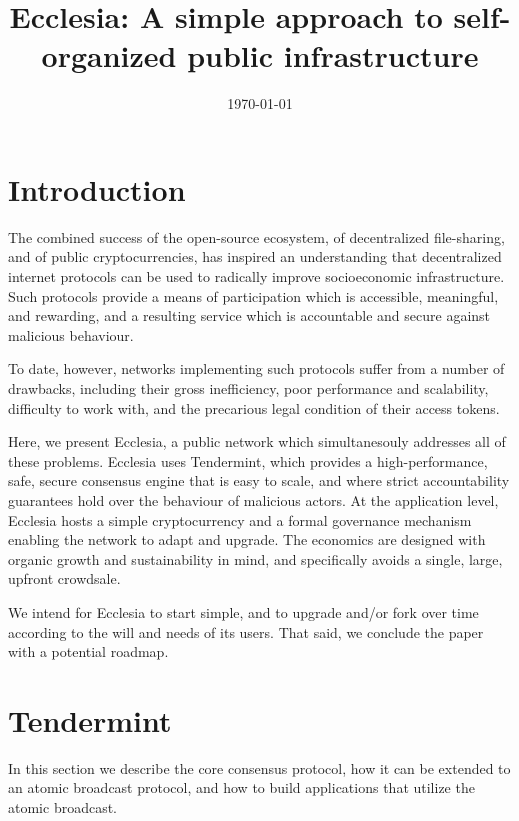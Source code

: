 \documentclass[12pt]{article}
\begin{document}
\title{
	{Ecclesia: A simple approach to self-organized public infrastructure}
}

\author{}
\date{\today}

\maketitle

\section{Introduction}

The combined success of the open-source ecosystem, of decentralized file-sharing, and of public cryptocurrencies,
has inspired an understanding that decentralized internet protocols 
can be used to radically improve socioeconomic infrastructure.
Such protocols provide a means of participation which is accessible, meaningful, and rewarding,
and a resulting service which is accountable and secure against malicious behaviour.

To date, however, networks implementing such protocols suffer from a number of drawbacks,
including their gross inefficiency, poor performance and scalability, difficulty to work with,
and the precarious legal condition of their access tokens.

Here, we present Ecclesia, a public network which simultanesouly addresses all of these problems.
Ecclesia uses Tendermint, which provides a high-performance, safe, secure consensus engine that is easy to scale, 
and where strict accountability guarantees hold over the behaviour of malicious actors.
At the application level, Ecclesia hosts a simple cryptocurrency and a formal governance mechanism enabling
the network to adapt and upgrade. 
The economics are designed with organic growth and sustainability in mind, 
and specifically avoids a single, large, upfront crowdsale.

We intend for Ecclesia to start simple, and to upgrade and/or fork over time 
according to the will and needs of its users.
That said, we conclude the paper with a potential roadmap.

\section{Tendermint}

In this section we describe the core consensus protocol,
how it can be extended to an atomic broadcast protocol,
and how to build applications that utilize the atomic broadcast.
\end{document}
